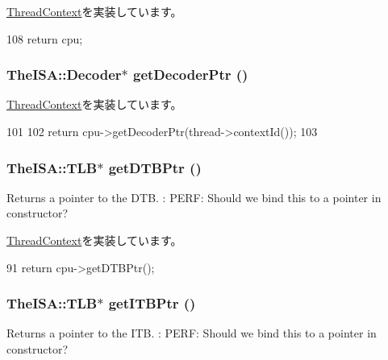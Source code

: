 \hyperlink{classThreadContext_ad10a7ef049c2d2ffadfc809341e66d4e}{ThreadContext}を実装しています。


\begin{DoxyCode}
108 { return cpu; }
\end{DoxyCode}
\hypertarget{classInOrderThreadContext_a6ae33963bc5f8b515f0a50c483f21c7f}{
\subsubsection[{getDecoderPtr}]{\setlength{\rightskip}{0pt plus 5cm}TheISA::Decoder$\ast$ getDecoderPtr ()}}
\label{classInOrderThreadContext_a6ae33963bc5f8b515f0a50c483f21c7f}


\hyperlink{classThreadContext_a14aa0e2adc88b9bc615f708aad02d80f}{ThreadContext}を実装しています。


\begin{DoxyCode}
101     {
102         return cpu->getDecoderPtr(thread->contextId());
103     }
\end{DoxyCode}
\hypertarget{classInOrderThreadContext_a2fe6a07c44bc2a4d83b86bea605ba971}{
\subsubsection[{getDTBPtr}]{\setlength{\rightskip}{0pt plus 5cm}TheISA::TLB$\ast$ getDTBPtr ()}}
\label{classInOrderThreadContext_a2fe6a07c44bc2a4d83b86bea605ba971}
Returns a pointer to the DTB. : PERF: Should we bind this to a pointer in constructor? 

\hyperlink{classThreadContext_a235a0443e22590632cfc95cd4f6db1ae}{ThreadContext}を実装しています。


\begin{DoxyCode}
91 { return cpu->getDTBPtr(); }
\end{DoxyCode}
\hypertarget{classInOrderThreadContext_a95b7e95d0558cd03d69613142fff9137}{
\subsubsection[{getITBPtr}]{\setlength{\rightskip}{0pt plus 5cm}TheISA::TLB$\ast$ getITBPtr ()}}
\label{classInOrderThreadContext_a95b7e95d0558cd03d69613142fff9137}
Returns a pointer to the ITB. : PERF: Should we bind this to a pointer in constructor? 

